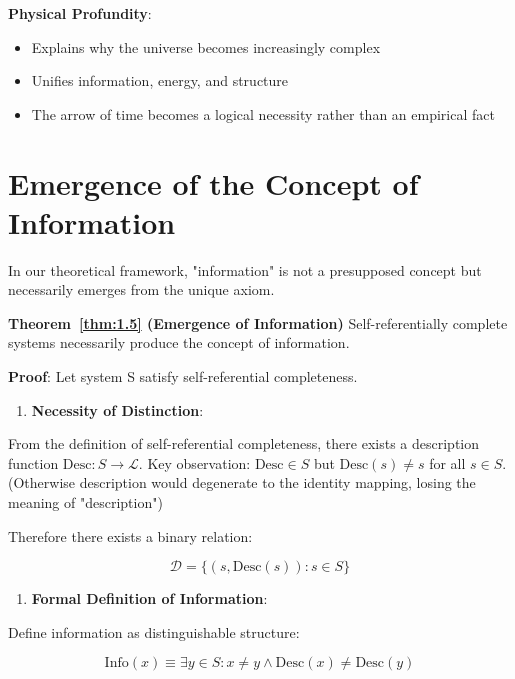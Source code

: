 \textbf{Physical Profundity}:
\begin{itemize}
\item Explains why the universe becomes increasingly complex
\item Unifies information, energy, and structure
\item The arrow of time becomes a logical necessity rather than an empirical fact
\end{itemize}

\section{Emergence of the Concept of Information}
\label{sec:ch03_derivation:emergence-of-the-concept-of-information}

In our theoretical framework, "information" is not a presupposed concept but necessarily emerges from the unique axiom.

\textbf{Theorem~\ref{thm:1.5} (Emergence of Information)}
\label{thm:1.5}
Self-referentially complete systems necessarily produce the concept of information.

\textbf{Proof}:
Let system S satisfy self-referential completeness.

\begin{enumerate}
\item \textbf{Necessity of Distinction}:
\end{enumerate}
   From the definition of self-referential completeness, there exists a description function $\text{Desc}: S \to \mathcal{L}$.
   Key observation: $\text{Desc} \in S$ but $\text{Desc}(s) \neq s$ for all $s \in S$.
   (Otherwise description would degenerate to the identity mapping, losing the meaning of "description")
   
   Therefore there exists a binary relation:
   
\begin{equation}
\mathcal{D} = \{(s, \text{Desc}(s)): s \in S\}
\end{equation}
\begin{enumerate}
\item \textbf{Formal Definition of Information}:
\end{enumerate}
   Define information as distinguishable structure:
   
\begin{equation}
\text{Info}(x) \equiv \exists y \in S: x \neq y \land \text{Desc}(x) \neq \text{Desc}(y)
\end{equation}
   
